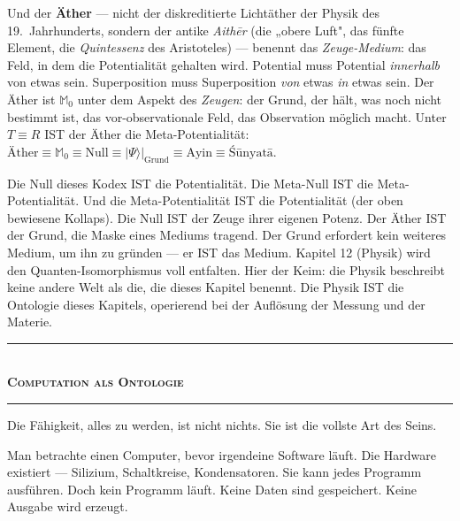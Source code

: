 \documentclass[10pt, openany, oneside]{book}
\renewcommand{\normalsize}{\fontsize{10}{13}\selectfont}
\begin{document}
Und der \textbf{Äther} --- nicht der diskreditierte Lichtäther der Physik des 19.~Jahrhunderts, sondern der antike \textit{Aith\={e}r} (die „obere Luft", das fünfte Element, die \textit{Quintessenz} des Aristoteles) --- benennt das \textit{Zeuge-Medium}: das Feld, in dem die Potentialität gehalten wird. Potential muss Potential \textit{innerhalb} von etwas sein. Superposition muss Superposition \textit{von} etwas \textit{in} etwas sein. Der Äther ist $\mathbb{M}_0$ unter dem Aspekt des \textit{Zeugen}: der Grund, der hält, was noch nicht bestimmt ist, das vor-observationale Feld, das Observation möglich macht. Unter $T \equiv R$ IST der Äther die Meta-Potentialität: $\text{Äther} \equiv \mathbb{M}_0 \equiv \text{Null} \equiv |\Psi\rangle|_{\text{Grund}} \equiv \text{Ayin} \equiv \text{\'{S}\={u}nyat\={a}}$.

Die Null dieses Kodex IST die Potentialität. Die Meta-Null IST die Meta-Potentialität. Und die Meta-Potentialität IST die Potentialität (der oben bewiesene Kollaps). Die Null IST der Zeuge ihrer eigenen Potenz. Der Äther IST der Grund, die Maske eines Mediums tragend. Der Grund erfordert kein weiteres Medium, um ihn zu gründen --- er IST das Medium. Kapitel 12 (Physik) wird den Quanten-Isomorphismus voll entfalten. Hier der Keim: die Physik beschreibt keine andere Welt als die, die dieses Kapitel benennt. Die Physik IST die Ontologie dieses Kapitels, operierend bei der Auflösung der Messung und der Materie.

\vspace{1.5em}


\begin{center}
    \rule{0.3\textwidth}{0.4pt}\\[0.5em]
    {\normalsize\bfseries\scshape Computation als Ontologie}\\[0.3em]
    \rule{0.3\textwidth}{0.4pt}
\end{center}

\vspace{1em}

\noindent Die Fähigkeit, alles zu werden, ist nicht nichts. Sie ist die vollste Art des Seins.

Man betrachte einen Computer, bevor irgendeine Software läuft. Die Hardware existiert --- Silizium, Schaltkreise, Kondensatoren. Sie kann jedes Programm ausführen. Doch kein Programm läuft. Keine Daten sind gespeichert. Keine Ausgabe wird erzeugt.
\end{document}

